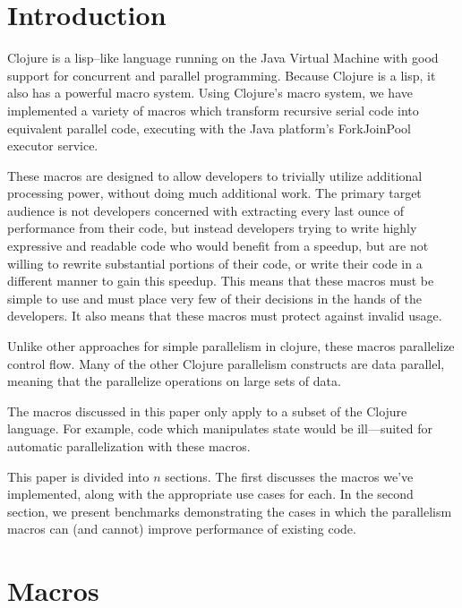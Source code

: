 \documentclass{article}
\begin{document}
\section{Introduction}
Clojure is a lisp--like language running on the Java Virtual Machine with good support for concurrent and parallel programming.
Because Clojure is a lisp, it also has a powerful macro system.
Using Clojure's macro system, we have implemented a variety of macros which transform recursive serial code into equivalent parallel code, executing with the Java platform's ForkJoinPool executor service.

These macros are designed to allow developers to trivially utilize additional processing power, without doing much additional work.
The primary target audience is not developers concerned with extracting every last ounce of performance from their code, but instead developers trying to write highly expressive and readable code who would benefit from a speedup, but are not willing to rewrite substantial portions of their code, or write their code in a different manner to gain this speedup.
This means that these macros must be simple to use and must place very few of their decisions in the hands of the developers.
It also means that these macros must protect against invalid usage.

Unlike other approaches for simple parallelism in clojure, these macros parallelize control flow. %
Many of the other Clojure parallelism constructs are data parallel, meaning that the parallelize operations on large sets of data. %


The macros discussed in this paper only apply to a subset of the Clojure language. For example, code which manipulates state would be ill---suited for automatic parallelization with these macros.

This paper is divided into $n$ sections. The first discusses the macros we've implemented, along with the appropriate use cases for each. In the second section, we present benchmarks demonstrating the cases in which the parallelism macros can (and cannot) improve performance of existing code.

\section{Macros}
\end{document}
